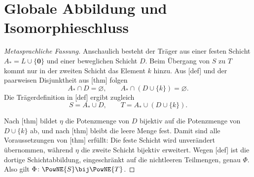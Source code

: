 \documentclass[main.tex]{subfiles}
\begin{document}
\section{Globale Abbildung und Isomorphieschluss}

\begin{proof}[Metasprachliche Fassung]
Anschaulich besteht der Träger aus einer festen Schicht
\(A_*=L\cup\{\mathbf0\}\) und einer beweglichen Schicht \(D\). Beim
Übergang von \(S\) zu \(T\) kommt nur in der zweiten Schicht das Element
\(k\) hinzu. Aus [def] und der
paarweisen Disjunktheit aus
[thm] folgen
\[
  A_*\cap D=\varnothing,
  \qquad
  A_*\cap(D\cup\{k\})=\varnothing.
\]
Die Trägerdefinition in [def] ergibt
zugleich
\[
  S=A_*\cup D,
  \qquad
  T=A_*\cup(D\cup\{k\}).
\]

Nach [thm] bildet
\(\eta\) die Potenzmenge von \(D\) bijektiv auf die Potenzmenge von
\(D\cup\{k\}\) ab, und nach
[thm] bleibt die leere
Menge fest. Damit sind alle Voraussetzungen von
[thm] erfüllt: Die feste
Schicht wird unverändert übernommen, während \(\eta\) die zweite Schicht
bijektiv erweitert. Wegen [def] ist die
dortige Schichtabbildung, eingeschränkt auf die nichtleeren Teilmengen,
genau \(\Phi\). Also gilt \(\Phi\colon\PowNE{S}\bij\PowNE{T}\).
\end{proof}

\MogTableProofHeading
\begin{tabproofwide}
\end{tabproofwide}
\end{document}
